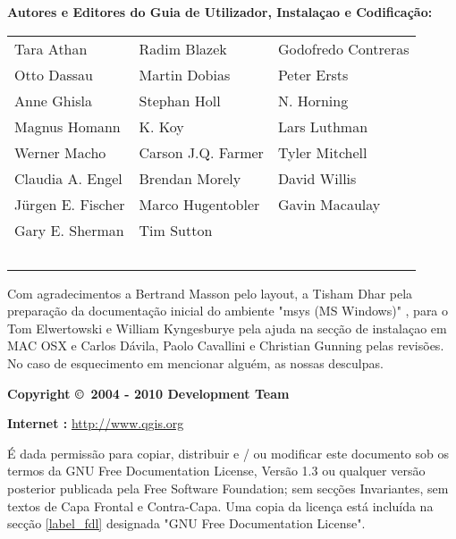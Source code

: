 \begin{flushleft}
\textbf{Autores e Editores do Guia de Utilizador, Instalaçao e Codificação:}
  \par\bigskip\noindent
\begin{tabular}{p{4cm} p{4cm} p{4cm}}
Tara Athan & Radim Blazek & Godofredo Contreras \\
Otto Dassau & Martin Dobias & Peter Ersts \\
Anne Ghisla & Stephan Holl & N. Horning \\
Magnus Homann & K. Koy & Lars Luthman \\ 
Werner Macho & Carson J.Q. Farmer & Tyler Mitchell \\
Claudia A. Engel & Brendan Morely & David Willis \\
Jürgen E. Fischer & Marco Hugentobler & Gavin Macaulay \\
Gary E. Sherman & Tim Sutton \\ \
\end{tabular}
\end{flushleft}

Com agradecimentos a Bertrand Masson pelo layout, a Tisham Dhar pela preparação 
da documentação inicial do ambiente "msys (MS Windows)" , para o Tom Elwertowski e William Kyngesburye pela
ajuda na secção de instalaçao em MAC OSX e Carlos Dávila, Paolo
Cavallini e Christian Gunning pelas revisões. No caso de esquecimento em 
mencionar alguém, as nossas desculpas.
\par\bigskip\noindent
\textbf{Copyright \copyright~2004 - 2010 \QG Development Team}
\par\bigskip\noindent
\textbf{Internet :} \url{http://www.qgis.org}


É dada permissão para copiar, distribuir e / ou modificar este documento sob 
os termos da GNU Free Documentation License, Versão 1.3 ou qualquer versão posterior 
publicada pela Free Software Foundation; sem secções Invariantes, 
sem textos de Capa Frontal e Contra-Capa.  Uma copia da 
licença está incluída na secção \ref{label_fdl} designada "GNU Free Documentation 
License".

\newpage
